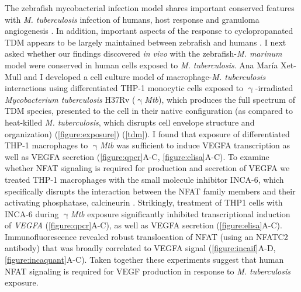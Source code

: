 The zebrafish mycobacterial infection model shares important conserved features with \textit{M. tuberculosis} infection of humans, host response and granuloma angiogenesis \citep{Swaim2006, Datta2015, Oehlers2015, Cronan2021}. In addition, important aspects of the response to cyclopropanated TDM appears to be largely maintained between zebrafish and humans \citep{Walton2018, Rao2005}. I next asked whether our findings discovered \textit{in vivo} with the zebrafish\hyp{}\textit{M. marinum} model were conserved in human cells exposed to \textit{M. tuberculosis}. Ana Mar\'{i}a Xet-Mull and I developed a cell culture model of macrophage\hyp{}\textit{M. tuberculosis} interactions using differentiated THP\hyp{}1 monocytic cells exposed to $\upgamma$\hyp{}irradiated \textit{Mycobacterium tuberculosis} H37Rv ($\upgamma$\textit{Mtb}), which produces the full spectrum of TDM species, presented to the cell in their native configuration (as compared to heat\hyp{}killed \textit{M. tuberculosis}, which disrupts cell envelope structure and organization) \citep{Romero2014, SecanellaFandos2014} (\autoref{figure:exposure}) (\autoref{tdm}). I found that exposure of differentiated THP\hyp{}1 macrophages to $\upgamma$\textit{Mtb} was sufficient to induce VEGFA transcription as well as VEGFA secretion (\autoref{figure:qpcr}A\hyp{}C, \autoref{figure:elisa}A\hyp{}C). To examine whether NFAT signaling is required for production and secretion of VEGFA we treated THP\hyp{}1 macrophages with the small molecule inhibitor INCA\hyp{}6, which specifically disrupts the interaction between the NFAT family members and their activating phosphatase, calcineurin \citep{Roehrl2004a, Roehrl2004b}. Strikingly, treatment of THP1 cells with INCA\hyp{}6 during $\upgamma$\textit{Mtb} exposure significantly inhibited transcriptional induction of \textit{VEGFA} (\autoref{figure:qpcr}A\hyp{}C), as well as VEGFA secretion (\autoref{figure:elisa}A\hyp{}C). Immunofluorescence revealed robust translocation of NFAT (using an NFATC2 antibody) that was broadly correlated to VEGFA signal (\autoref{figure:incaif}A\hyp{}D, \autoref{figure:incaquant}A\hyp{}C). Taken together these experiments suggest that human NFAT signaling is required for VEGF production in response to \textit{M. tuberculosis} exposure.

